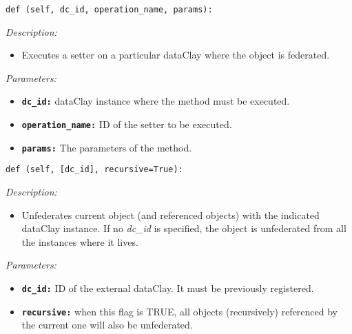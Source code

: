 \begin{dBox}
\texttt{def (self, dc\_id, operation\_name, params):}
\LINE

{\it Description:}

\begin{itemize}
  \item Executes a setter on a particular dataClay where the object is federated.
\end{itemize}

{\it Parameters:}

\begin{itemize}
  \item \texttt{\bfseries dc\_id:} dataClay instance where the method must be executed.
  \item \texttt{\bfseries operation\_name:} ID of the setter to be executed.
  \item \texttt{\bfseries params:} The parameters of the method.
\end{itemize}
 
\end{dBox}

\begin{dBox}

\texttt{def (self, [dc\_id], recursive=True):}
\LINE

{\it Description:}

\begin{itemize}
  \item Unfederates current object (and referenced objects) with the indicated dataClay instance. If no \textit{dc\_id} is specified, the object is unfederated from all the instances where it lives.
\end{itemize}

{\it Parameters:}

\begin{itemize}
  \item \texttt{\bfseries dc\_id:} ID of the external dataClay. It must be previously registered.
  \item \texttt{\bfseries recursive:} when this flag is TRUE, all objects (recursively) referenced by the current one will also be unfederated.
\end{itemize}

\end{dBox}







